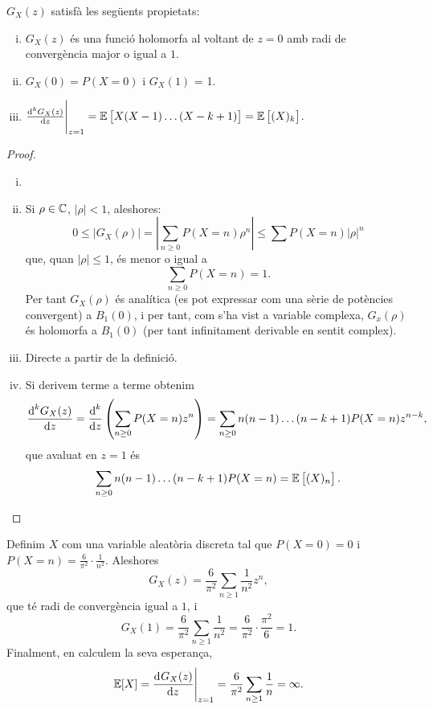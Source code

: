 \begin{prop}
    $G_X(z)$ satisfà les següents propietats:
    \begin{enumerate}[i)]
    \item $G_X(z)$ \'es una funció holomorfa al voltant de $z = 0$ amb radi de convergència
        major o igual a $1$.
    \item $G_X(0) = P(X = 0)$ i $G_X(1)$ = 1.
    \item $\eval{\frac{\text{d}^kG_X(z)}{\text{d}z}}_{z = 1} = 
        \esp\lb X(X-1)\dots(X-k+1)\rb = \esp \lb (X)_k\rb $.
    \end{enumerate}
\end{prop}

\begin{proof}
    \begin{enumerate}[i)]
        \item[]
        \item Si $\rho \in \mathbb{C}$, $|\rho| < 1$, aleshores:
            \[
                0 \leq |G_X(\rho)| = \left|\sum_{n \geq 0} P(X = n) \rho^n \right|
                \leq \sum P(X=n) |\rho|^n
            \]
            que, quan $|\rho| \leq 1$, \'es menor o igual a
            \[
                \sum_{n \geq 0} P(X = n) = 1.
            \]
            Per tant $G_X(\rho)$ \'es analítica (es pot expressar com una sèrie de
            potències convergent) a $B_1(0)$, i per tant, com s'ha vist a variable
            complexa, $G_x(\rho)$ \'es holomorfa a $B_1(0)$ (per tant infinitament
            derivable en sentit complex).
        \item  Directe a partir de la definició.
        \item Si derivem terme a terme obtenim
            \[
                \frac{\text{d}^kG_X(z)}{\text{d}z} = \frac{\text{d}^k}{\text{d}z} \left( \sum_{n \geq 0} P(X = n) z^n\right)=
                \sum_{n \geq 0} n(n-1)\dots(n-k+1)P(X = n) z^{n-k},
            \]
            que avaluat en $z = 1$ \'es
            \[ 
                \sum_{n \geq 0} n(n-1)\dots(n-k+1)P(X=n) = \operatorname{\mathbb{E}}\left[(X)_n\right].
            \]
    \end{enumerate}
\end{proof}

\begin{example}
   Definim $X$ com una variable aleatòria discreta tal que $P(X = 0) = 0$ i
   $P(X = n) = \frac{6}{\pi^2}\cdot \frac{1}{n^2}$. Aleshores
    \[
        G_X(z) =  \frac{6}{\pi^2} \sum_{n \geq 1} \frac{1}{n^2}z^n,
    \]
    que t\'e radi de convergència igual a $1$, i
    \[
        G_X(1) = \frac{6}{\pi^2} \sum_{n \geq 1} \frac{1}{n^2} =
        \frac{6}{\pi^2}\cdot \frac{\pi^2}{6} = 1.
    \]
    Finalment, en calculem la seva esperança,
    \[
        \esp[X] = \eval{\dv{G_X(z)}{z}}_{z = 1} = 
        \frac{6}{\pi^2}\sum_{n \geq 1} \frac{1}{n} = \infty.
    \]
\end{example}

